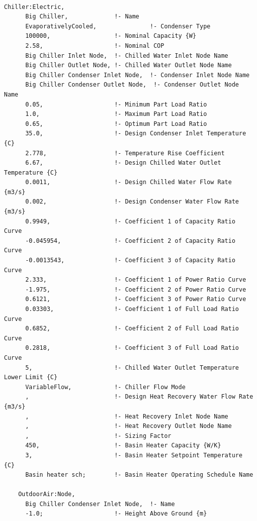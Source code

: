 \begin{lstlisting}

Chiller:Electric,
      Big Chiller,             !- Name
      EvaporativelyCooled,               !- Condenser Type
      100000,                  !- Nominal Capacity {W}
      2.58,                    !- Nominal COP
      Big Chiller Inlet Node,  !- Chilled Water Inlet Node Name
      Big Chiller Outlet Node, !- Chilled Water Outlet Node Name
      Big Chiller Condenser Inlet Node,  !- Condenser Inlet Node Name
      Big Chiller Condenser Outlet Node,  !- Condenser Outlet Node Name
      0.05,                    !- Minimum Part Load Ratio
      1.0,                     !- Maximum Part Load Ratio
      0.65,                    !- Optimum Part Load Ratio
      35.0,                    !- Design Condenser Inlet Temperature {C}
      2.778,                   !- Temperature Rise Coefficient
      6.67,                    !- Design Chilled Water Outlet Temperature {C}
      0.0011,                  !- Design Chilled Water Flow Rate {m3/s}
      0.002,                   !- Design Condenser Water Flow Rate {m3/s}
      0.9949,                  !- Coefficient 1 of Capacity Ratio Curve
      -0.045954,               !- Coefficient 2 of Capacity Ratio Curve
      -0.0013543,              !- Coefficient 3 of Capacity Ratio Curve
      2.333,                   !- Coefficient 1 of Power Ratio Curve
      -1.975,                  !- Coefficient 2 of Power Ratio Curve
      0.6121,                  !- Coefficient 3 of Power Ratio Curve
      0.03303,                 !- Coefficient 1 of Full Load Ratio Curve
      0.6852,                  !- Coefficient 2 of Full Load Ratio Curve
      0.2818,                  !- Coefficient 3 of Full Load Ratio Curve
      5,                       !- Chilled Water Outlet Temperature Lower Limit {C}
      VariableFlow,            !- Chiller Flow Mode
      ,                        !- Design Heat Recovery Water Flow Rate {m3/s}
      ,                        !- Heat Recovery Inlet Node Name
      ,                        !- Heat Recovery Outlet Node Name
      ,                        !- Sizing Factor
      450,                     !- Basin Heater Capacity {W/K}
      3,                       !- Basin Heater Setpoint Temperature {C}
      Basin heater sch;        !- Basin Heater Operating Schedule Name

    OutdoorAir:Node,
      Big Chiller Condenser Inlet Node,  !- Name
      -1.0;                    !- Height Above Ground {m}
\end{lstlisting}

